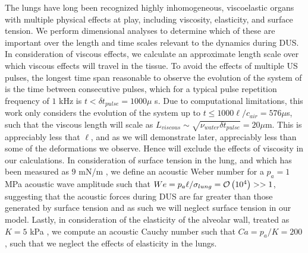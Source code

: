 The lungs have long been recognized highly inhomogeneous, viscoelastic
organs \citep{Bayliss1939,Suki1994} with multiple physical effects at
play, including viscosity, elasticity, and surface tension. We perform
dimensional analyses to determine which of these are important over
the length and time scales relevant to the dynamics during
\ac{DUS}. In consideration of viscous effects, we calculate an
approximate length scale over which viscous effects will travel in the
tissue. To avoid the effects of multiple \ac{US} pulses, the longest
time span reasonable to observe the evolution of the system of is the
time between consecutive pulses, which for a typical pulse repetition
frequency of $1$ kHz is $t<\delta t_{pulse}=1000 \mu$ s. Due to
computational limitations, this work only considers the evolution of
the system up to $t\leq1000 \ell/c_{air}=576 \mu$s, such that the
viscous length will scale as
$L_{viscous}\sim\sqrt{\nu_{water} \delta t_{pulse}}=20 \mu$m. This is
appreciably less that $\ell$, and as we will demonstrate later,
appreciably less than some of the deformations we observe. Hence will
exclude the effects of viscosity in our calculations. In consideration
of surface tension in the lung, and which has been measured as $9$ mN/m
\citep{Schurch1976}, we define an acoustic Weber number for a
$p_a=1$ MPa acoustic wave amplitude such that
$We=p_a\ell/\sigma_{lung}=\mathcal{O}\left(10^4\right)>>1$, suggesting that the
acoustic forces during \ac{DUS} are far greater than those generated
by surface tension and as such we will neglect surface tension in our
model. Lastly, in consideration of the elasticity of the alveolar
wall, treated as $K = 5$ kPa \cite{Cavalcante2005}, we compute an
acoustic Cauchy number such that $Ca=p_a/K=200$, such that we neglect
the effects of elasticity in the lungs.
%
%
